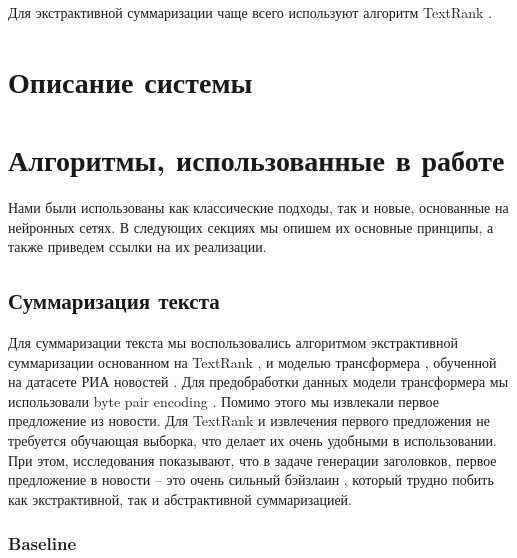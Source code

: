 \documentclass[aps,%
12pt,%
final,%
oneside,
onecolumn,%
musixtex, %
superscriptaddress,%
centertags]{article} %
\begin{document}
Для экстрактивной суммаризации чаще всего используют алгоритм TextRank \cite{TextrankOriginal}.



\section{Описание системы}

\section{Алгоритмы, использованные в работе}
Нами были использованы как классические подходы, так и новые, основанные на нейронных сетях.
В следующих секциях мы опишем их основные принципы, а также приведем ссылки на их реализации.

\subsection{Суммаризация текста}
Для суммаризации текста мы воспользовались алгоритмом экстрактивной суммаризации
основанном на TextRank \cite{DBLP:journals/corr/BarriosLAW16, rehurek_lrec, TextrankOriginal},
и моделью трансформера \cite{DBLP:journals/corr/VaswaniSPUJGKP17}, обученной на
датасете РИА новостей \cite{gavrilov2018self}.
Для предобработки данных модели трансформера мы использовали byte
pair encoding \cite{DBLP:journals/corr/SennrichHB15}.
Помимо этого мы извлекали первое предложение из новости.
Для TextRank и извлечения первого предложения не требуется обучающая выборка, что
делает их очень удобными в использовании. При этом, исследования показывают, что
в задаче генерации заголовков, первое предложение в новости --
это очень сильный бэйзлаин \cite{gavrilov2018self},
который трудно побить как экстрактивной, так и абстрактивной суммаризацией.

\subsubsection{Baseline}
\end{document}
